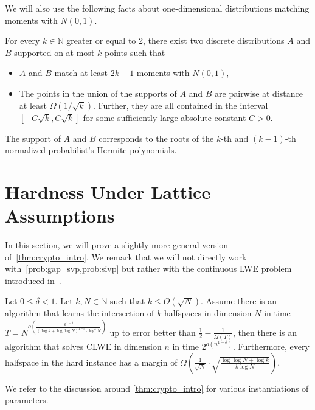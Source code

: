 \documentclass{theoretics}
\newcommand{\Paren}[1]{\left(#1\right)}
\newcommand{\N}{\mathbb N}
\renewcommand{\leq}{\leqslant}
\begin{document}
We will also use the following facts about one-dimensional distributions matching moments with $N(0,1)$.
\begin{fact}
    \label{fact:moment_matching_hermite}
    For every $k \in \N$ greater or equal to 2, there exist two discrete distributions $A$ and $B$ supported on at most $k$ points such that 
    \begin{itemize}
        \item $A$ and $B$ match at least $2k-1$ moments with $N(0,1)$,
        \item The points in the union of the supports of $A$ and $B$ are pairwise at distance at least $\Omega(1/\sqrt{k})$. Further, they are all contained in the interval $[-C\sqrt{k},C\sqrt{k}]$ for some sufficiently large absolute constant $C > 0$.
    \end{itemize}
\end{fact}
The support of $A$ and $B$ corresponds to the roots of the $k$-th and $(k-1)$-th normalized probabilist's Hermite polynomials.

\section{Hardness Under Lattice Assumptions}
\label{sec:crypto_hardness}

In this section, we will prove a slightly more general version of~\cref{thm:crypto_intro}.
We remark that we will not directly work with~\cref{prob:gap_svp,prob:sivp} but rather with the continuous LWE problem introduced in~\cite{CLWE}.
\begin{theorem}
    \label{thm:main_crypto_hardness}
    Let $0 \leq \delta < 1$.
    Let $k,N \in \N$ such that $k \leq O(\sqrt{N})$.
    Assume there is an algorithm that learns the intersection of $k$ halfspaces in dimension $N$ in time $T = N^{o\Paren{\tfrac {k^{1-\delta}} {\Paren{\log k + \log \log N}^{1-\delta}\cdot\log^\delta N}}}$ up to error better than $\tfrac 1 2 -\tfrac 1 {\Omega(T)}$, then there is an algorithm that solves CLWE in dimension $n$ in time $2^{o\Paren{n^{1-\delta}}}$.
    Furthermore, every halfspace in the hard instance has a margin of $\Omega(\tfrac 1 {\sqrt{N}} \cdot \sqrt{\tfrac {\log \log N + \log k} {k \log N}})$.
\end{theorem}




We refer to the discussion around \cref{thm:crypto_intro} for various instantiations of parameters.
\end{document}
